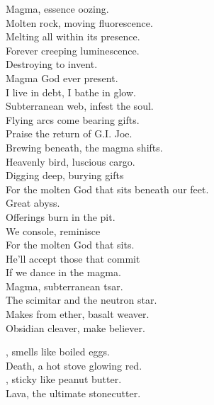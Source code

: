 Magma, essence oozing. \\
Molten rock, moving fluorescence. \\
Melting all within its presence. \\
Forever creeping luminescence. \\
Destroying to invent. \\
Magma God ever present. \\

I live in debt, I bathe in glow. \\
Subterranean web, infest the soul. \\
Flying arcs come bearing gifts. \\
Praise the return of G.I. Joe. \\

Brewing beneath, the magma shifts. \\
Heavenly bird, luscious cargo. \\
Digging deep, burying gifts \\
For the molten God that sits beneath our feet. \\

Great abyss. \\
Offerings burn in the pit. \\
We console, reminisce \\
For the molten God that sits. \\
He'll accept those that commit \\
If we dance in the magma. \\

Magma, subterranean tsar. \\
The scimitar and the neutron star. \\
Makes from ether, basalt weaver. \\
Obsidian cleaver, make believer. \\





, smells like boiled eggs. \\
Death, a hot stove glowing red. \\
, sticky like peanut butter. \\
Lava, the ultimate stonecutter. \\

